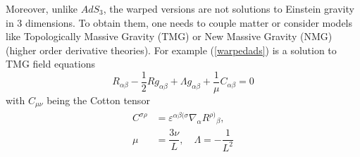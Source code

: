 \documentclass[preprint,aps,tightenlines,showkeys,nofootinbib,superscriptaddress,amsmath]{revtex4}
\begin{document}
Moreover, unlike $AdS_3$, the warped versions are not solutions to
Einstein gravity in 3 dimensions. To obtain them, one needs to couple
matter or consider models like Topologically Massive Gravity (TMG) or New
Massive Gravity (NMG) (higher order derivative theories). For example
(\ref{warpedads}) is a solution to TMG field equations
\begin{equation}
  R_{\alpha\beta}-\frac{1}{2}R g_{\alpha\beta }+\Lambda g_{\alpha  \beta
  }+\frac{1}{\mu } C_{\alpha \beta }=0
\end{equation}
with $C_{\mu \nu }$ being the Cotton tensor
\begin{eqnarray}
  C^{\sigma \rho }&=\varepsilon^{\alpha \beta (\sigma }\nabla_{\alpha
  }R^{\rho) }{}_{\beta },\nonumber\\
  \mu &=\dfrac{3\nu}{L},\quad\Lambda=-\dfrac{1}{L^{2} }
\end{eqnarray}
\end{document}

